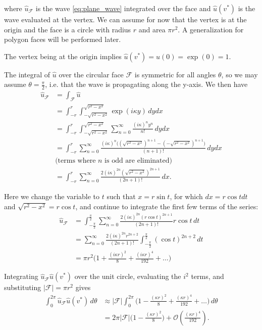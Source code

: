 \documentclass[utf8,english]{gradu3}
\begin{document}
where $\hat{u}_{\mathcal{F}}$ is the wave \eqref{eq:plane_wave}
integrated over the face and $\hat{u}(v^*)$ is the wave evaluated at the vertex.
We can assume for now that the vertex is at the origin
and the face is a circle with radius $r$ and area $\pi r^2$.
A generalization for polygon faces will be performed later.

The vertex being at the origin implies $\hat{u}(v^*) = \hat{u}(0) = \exp(0) = 1$.

The integral of $\hat{u}$ over the circular face $\mathcal{F}$ is
symmetric for all angles $\theta$, so we may assume $\theta = \frac{\pi}{2}$,
i.e. that the wave is propagating along the y-axis.
We then have
\begin{align*}
  \hat{u}_{\mathcal{F}} &= \int_{\mathcal{F}} \hat{u} \\
  &= \int_{-r}^{r} \int_{-\sqrt{r^2 - x^2}}^{\sqrt{r^2 - x^2}}
    \exp(i\kappa y) \,dydx \\
  &= \int_{-r}^{r} \int_{-\sqrt{r^2 - x^2}}^{\sqrt{r^2 - x^2}}
    \sum_{n=0}^{\infty} \frac{(i\kappa)^n y^n}{n!} \,dydx \\
  &= \int_{-r}^{r} \sum_{n=0}^{\infty}
    \frac{(i\kappa)^n \Big((\sqrt{r^2 - x^2})^{n+1} - (-\sqrt{r^2 - x^2})^{n+1} \Big)}{(n + 1)!} \,dydx \\
  &\text{(terms where $n$ is odd are eliminated)} \\
  &= \int_{-r}^{r} \sum_{n=0}^{\infty} \frac{2 (i\kappa)^{2n} (\sqrt{r^2 - x^2})^{2n+1}}{(2n + 1)!} \,dx.
\end{align*}

Here we change the variable to $t$ such that $x = r\sin t$,
for which $dx = r\cos t dt$ and $\sqrt{r^2 - x^2} = r\cos t$,
and continue to integrate the first few terms of the series:
\begin{align*}
\hat{u}_{\mathcal{F}}
&= \int_{-\frac{\pi}{2}}^{\frac{\pi}{2}}
  \sum_{n=0}^{\infty} \frac{2(i\kappa)^{2n} (r\cos t)^{2n+1}}{(2n + 1)!} r\cos t \,dt \\
&= \sum_{n=0}^{\infty} \frac{2(i\kappa)^{2n} r^{2n+2}}{(2n + 1)!}
  \int_{-\frac{\pi}{2}}^{\frac{\pi}{2}} (\cos t)^{2n+2} \,dt \\
&= \pi r^2 \Big( 1 + \frac{(i\kappa r)^2}{8} + \frac{(i\kappa r)^4}{192} + \dots \Big)
\end{align*}

Integrating $\hat{u}_{\mathcal{F}} \hat{u}(v^*)$ over the unit circle,
evaluating the $i^2$ terms,
and substituting $|\mathcal{F}| = \pi r^2$ gives
\begin{align*}
\int_{0}^{2\pi} \hat{u}_{\mathcal{F}} \hat{u}(v^*) \,d\theta
&\approx |\mathcal{F}| \int_{0}^{2\pi}
  \Big( 1 - \frac{(\kappa r)^2}{8} + \frac{(\kappa r)^4}{192} + \dots \Big) \,d\theta \\
&= 2\pi |\mathcal{F}| \Big( 1 - \frac{(\kappa r)^2}{8} \Big)
+ \mathcal{O}(\frac{(\kappa r)^4}{192}).
\end{align*}
\end{document}
